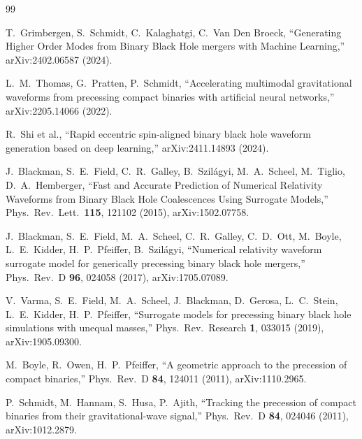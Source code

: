 \documentclass[11pt,a4paper]{article}
\begin{document}
\begin{thebibliography}{99}

T.~Grimbergen, S.~Schmidt, C.~Kalaghatgi, C.~Van Den Broeck,
``Generating Higher Order Modes from Binary Black Hole mergers with Machine Learning,''
arXiv:2402.06587 (2024).

L.~M.~Thomas, G.~Pratten, P.~Schmidt,
``Accelerating multimodal gravitational waveforms from precessing compact binaries with artificial neural networks,''
arXiv:2205.14066 (2022).

R.~Shi et al.,
``Rapid eccentric spin-aligned binary black hole waveform generation based on deep learning,''
arXiv:2411.14893 (2024).

J.~Blackman, S.~E.~Field, C.~R.~Galley, B.~Szil\'agyi, M.~A.~Scheel, M.~Tiglio, D.~A.~Hemberger,
``Fast and Accurate Prediction of Numerical Relativity Waveforms from Binary Black Hole Coalescences Using Surrogate Models,''
Phys.\ Rev.\ Lett.\ \textbf{115}, 121102 (2015), arXiv:1502.07758.

J.~Blackman, S.~E.~Field, M.~A.~Scheel, C.~R.~Galley, C.~D.~Ott, M.~Boyle, L.~E.~Kidder, H.~P.~Pfeiffer, B.~Szil\'agyi,
``Numerical relativity waveform surrogate model for generically precessing binary black hole mergers,''
Phys.\ Rev.\ D \textbf{96}, 024058 (2017), arXiv:1705.07089.

V.~Varma, S.~E.~Field, M.~A.~Scheel, J.~Blackman, D.~Gerosa, L.~C.~Stein, L.~E.~Kidder, H.~P.~Pfeiffer,
``Surrogate models for precessing binary black hole simulations with unequal masses,''
Phys.\ Rev.\ Research \textbf{1}, 033015 (2019), arXiv:1905.09300.

M.~Boyle, R.~Owen, H.~P.~Pfeiffer,
``A geometric approach to the precession of compact binaries,''
Phys.\ Rev.\ D \textbf{84}, 124011 (2011), arXiv:1110.2965.

P.~Schmidt, M.~Hannam, S.~Husa, P.~Ajith,
``Tracking the precession of compact binaries from their gravitational-wave signal,''
Phys.\ Rev.\ D \textbf{84}, 024046 (2011), arXiv:1012.2879.

\end{thebibliography}
\end{document}

